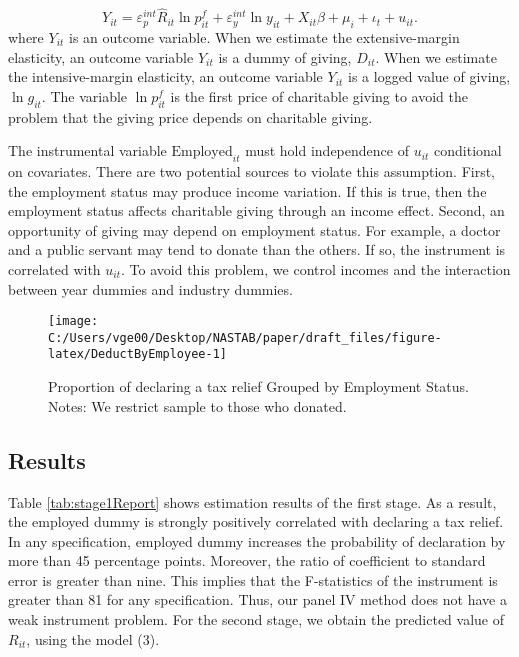 \documentclass[
  11pt,
  a4paper,
]{article}
\begin{document}
\begin{equation}
    Y_{it} = \varepsilon^{int}_p \hat{R}_{it} \ln p^f_{it} + \varepsilon^{int}_y \ln y_{it} 
    + X_{it}\beta +\mu_i +\iota_t +u_{it}. \label{eq:stage2}
\end{equation}
where \(Y_{it}\) is an outcome variable.
When we estimate the extensive-margin elasticity,
an outcome variable \(Y_{it}\) is a dummy of giving, \(D_{it}\).
When we estimate the intensive-margin elasticity,
an outcome variable \(Y_{it}\) is a logged value of giving, \(\ln g_{it}\).
The variable \(\ln p^f_{it}\) is the first price of charitable giving
to avoid the problem that the giving price depends on charitable giving.

The instrumental variable \(\text{Employed}_{it}\) must hold independence of \(u_{it}\) conditional on covariates.
There are two potential sources to violate this assumption.
First, the employment status may produce income variation.
If this is true, then the employment status affects charitable giving through an income effect.
Second, an opportunity of giving may depend on employment status.
For example, a doctor and a public servant may tend to donate than the others.
If so, the instrument is correlated with \(u_{it}\).
To avoid this problem, we control incomes and the interaction between year dummies and industry dummies.

\begin{figure}[t]

{\centering \texttt{[image: C:/Users/vge00/Desktop/NASTAB/paper/draft\_files/figure-latex/DeductByEmployee-1]} 

}

\caption{Proportion of declaring a tax relief Grouped by Employment Status. Notes: We restrict sample to those who donated.}\label{fig:DeductByEmployee}
\end{figure}

\hypertarget{results-1}{%
\subsection{Results}\label{results-1}}

Table \ref{tab:stage1Report} shows estimation results of the first stage.
As a result, the employed dummy is strongly positively correlated with declaring a tax relief.
In any specification, employed dummy increases the probability of declaration by more than 45 percentage points.
Moreover, the ratio of coefficient to standard error is greater than nine.
This implies that the F-statistics of the instrument is greater than 81 for any specification.
Thus, our panel IV method does not have a weak instrument problem.
For the second stage, we obtain the predicted value of \(R_{it}\), using the model (3).
\end{document}
